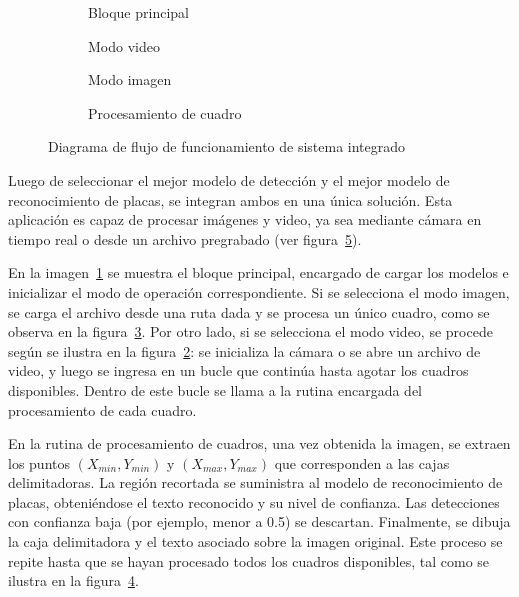 \begin{figure}[h]
	\centering
	\begin{subfigure}[b]{0.45\textwidth}
		\centering
		
		\caption{Bloque principal}
		\label{fig:flujo-app-main}
	\end{subfigure}
	\hfill
	\begin{subfigure}[b]{0.45\textwidth}
		\centering
		
		\caption{Modo video}
		\label{fig:flujo-app-video-mode}
	\end{subfigure}

	\begin{subfigure}[b]{0.25\textwidth}
		\centering
		
		\caption{Modo imagen}
		\label{fig:flujo-app-image-mode}
	\end{subfigure}
	\hfill
	\begin{subfigure}[b]{0.65\textwidth}
		\centering
		
		\caption{Procesamiento de cuadro}
		\label{fig:flujo-app-process-frame}
	\end{subfigure}

	\caption{Diagrama de flujo de funcionamiento de sistema integrado}
	\label{fig:integracion-app}
\end{figure}

Luego de seleccionar el mejor modelo de detección y el mejor modelo de reconocimiento de placas,
se integran ambos en una única solución. Esta aplicación es capaz de procesar imágenes y video,
ya sea mediante cámara en tiempo real o desde un archivo pregrabado (ver figura~\ref{fig:integracion-app}).

En la imagen~\ref{fig:flujo-app-main} se muestra el bloque principal,
encargado de cargar los modelos e inicializar el modo de operación correspondiente.
Si se selecciona el modo imagen, se carga el archivo desde una ruta dada y se procesa un único cuadro,
como se observa en la figura~\ref{fig:flujo-app-image-mode}.
Por otro lado, si se selecciona el modo video, se procede según se ilustra en la figura~\ref{fig:flujo-app-video-mode}:
se inicializa la cámara o se abre un archivo de video,
y luego se ingresa en un bucle que continúa hasta agotar los cuadros disponibles.
Dentro de este bucle se llama a la rutina encargada del procesamiento de cada cuadro.

En la rutina de procesamiento de cuadros, una vez obtenida la imagen,
se extraen los puntos $(X_{min}, Y_{min})$ y $(X_{max}, Y_{max})$ que corresponden a las cajas delimitadoras.
La región recortada se suministra al modelo de reconocimiento de placas,
obteniéndose el texto reconocido y su nivel de confianza.
Las detecciones con confianza baja (por ejemplo, menor a 0.5) se descartan.
Finalmente, se dibuja la caja delimitadora y el texto asociado sobre la imagen original.
Este proceso se repite hasta que se hayan procesado todos los cuadros disponibles,
tal como se ilustra en la figura~\ref{fig:flujo-app-process-frame}.

